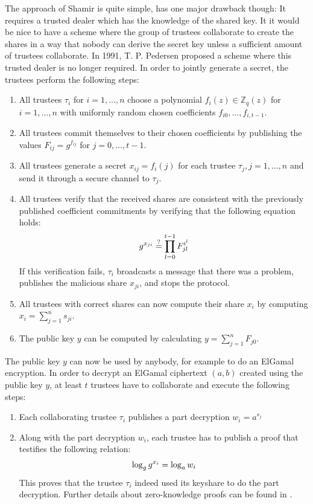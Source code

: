 \documentclass[numbers=noenddot, abstract=on, a4paper, headsepline,
footsepline, oneside, draft=off]{scrreprt}
\begin{document}
The approach of Shamir is quite simple, has one major drawback though: It
requires a trusted dealer which has the knowledge of the shared key. It it
would be nice to have a scheme where the group of trustees collaborate to create
the shares in a way that nobody can derive the secret key unless a sufficient
amount of trustees collaborate. In 1991, T. P. Pedersen proposed a scheme
\cite{PED91} where this trusted dealer is no longer required. In order to
jointly generate a secret, the trustees perform the following steps:
\begin{enumerate}
  \item All trustees $\tau_i$ for $i = 1, \ldots, n$ choose a polynomial $f_i(z)
  \in \mathbb{Z}_q(z)$ for $i = 1, \ldots, n$ with uniformly random chosen coefficients $f_{i0}, \ldots,
  f_{i, t-1}$.
  \item All trustees commit themselves to their chosen coefficients by
  publishing the values $F_{ij} = g^{f_{ij}}$ for $j=0,\ldots, t-1$.
  \item All trustees generate a secret $x_{ij} = f_i(j)$ for each
  trustee $\tau_j, j=1,\ldots,n$ and send it through a secure channel to
  $\tau_j$.
  \item All trustees verify that the received shares are consistent with the
  previously published coefficient commitments by verifying that the following
  equation holds:
  \begin{equation}
	g^{x_{ji}} \stackrel{?}{=} \prod_{l=0}^{t-1} F_{jl}^{i^l} \notag
  \end{equation}
  If this verification fails, $\tau_i$ broadcasts a message that there was a
  problem, publishes the malicious share $x_{ji}$, and stops the protocol.
  \item All trustees with correct shares can now compute their share $x_i$ by
  computing $x_i=\sum_{j=1}^n s_{ji}$.
  \item The public key $y$ can be computed by calculating $y=\sum_{j=1}^n
  F_{j0}$.
\end{enumerate}
The public key $y$ can now be used by anybody, for example to do an ElGamal
encryption. In order to decrypt an ElGamal ciphertext $(a, b)$ created using the
public key $y$, at least $t$ trustees have to collaborate and execute the following steps:
\begin{enumerate}
  \item Each collaborating trustee $\tau_i$ publishes a part decryption $w_i =
  a^{s_j}$
  \item Along with the part decryption $w_i$, each trustee has to publish a
  proof that testifies the following relation:
  \begin{equation}
	\log_g g^{x_i} = \log_a w_i \notag
  \end{equation}
  This proves that the trustee $\tau_i$ indeed used its keyshare to do the part
  decryption. Further details about zero-knowledge proofs can be found in
  .
\end{enumerate}
\end{document}
